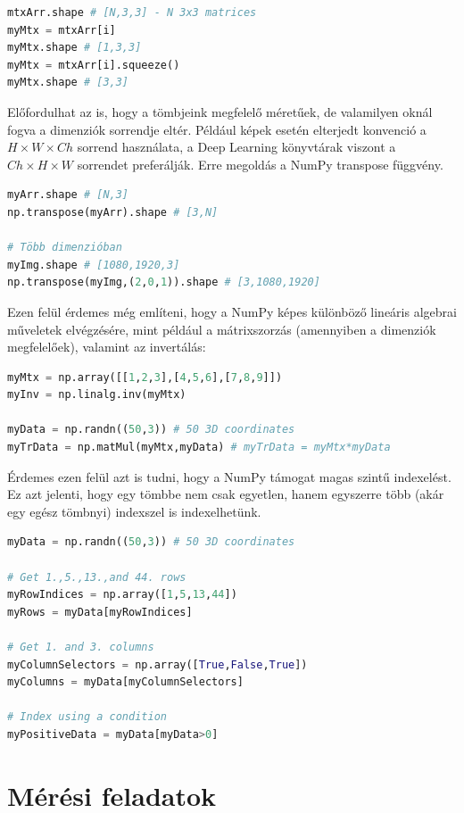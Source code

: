 \documentclass[12pt,a4paper,oneside]{report}             %
\begin{document}
\begin{lstlisting}[language=Python]
mtxArr.shape # [N,3,3] - N 3x3 matrices
myMtx = mtxArr[i]
myMtx.shape # [1,3,3]
myMtx = mtxArr[i].squeeze()
myMtx.shape # [3,3]
\end{lstlisting}

Előfordulhat az is, hogy a tömbjeink megfelelő méretűek, de valamilyen oknál fogva a dimenziók sorrendje eltér. Például képek esetén elterjedt konvenció a $H\times W\times Ch$ sorrend használata, a Deep Learning könyvtárak viszont a $Ch\times H\times W$ sorrendet preferálják. Erre megoldás a NumPy transpose függvény.

\begin{lstlisting}[language=Python]
myArr.shape # [N,3]
np.transpose(myArr).shape # [3,N]

# Több dimenzióban
myImg.shape # [1080,1920,3]
np.transpose(myImg,(2,0,1)).shape # [3,1080,1920]
\end{lstlisting}

Ezen felül érdemes még említeni, hogy a NumPy képes különböző lineáris algebrai műveletek elvégzésére, mint például a mátrixszorzás (amennyiben a dimenziók megfelelőek), valamint az invertálás:

\begin{lstlisting}[language=Python]
myMtx = np.array([[1,2,3],[4,5,6],[7,8,9]])
myInv = np.linalg.inv(myMtx)

myData = np.randn((50,3)) # 50 3D coordinates
myTrData = np.matMul(myMtx,myData) # myTrData = myMtx*myData
\end{lstlisting}

Érdemes ezen felül azt is tudni, hogy a NumPy támogat magas szintű indexelést. Ez azt jelenti, hogy egy tömbbe nem csak egyetlen, hanem egyszerre több (akár egy egész tömbnyi) indexszel is indexelhetünk.

\begin{lstlisting}[language=Python]
myData = np.randn((50,3)) # 50 3D coordinates

# Get 1.,5.,13.,and 44. rows
myRowIndices = np.array([1,5,13,44])
myRows = myData[myRowIndices]

# Get 1. and 3. columns
myColumnSelectors = np.array([True,False,True])
myColumns = myData[myColumnSelectors]

# Index using a condition
myPositiveData = myData[myData>0]
\end{lstlisting}

\chapter{Mérési feladatok}
\end{document}
